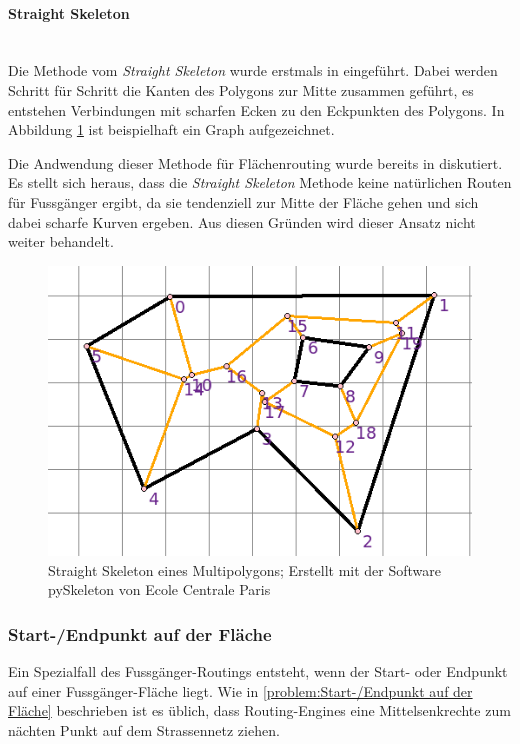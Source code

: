 \paragraph{Straight Skeleton}~\\

Die Methode vom \emph{Straight Skeleton} wurde erstmals in \cite{aichholzer_skeleton} eingeführt. Dabei werden Schritt für Schritt die Kanten des Polygons zur Mitte zusammen geführt, es entstehen Verbindungen mit scharfen Ecken zu den Eckpunkten des Polygons. In Abbildung \ref{fig:skeleton_example} ist beispielhaft ein Graph aufgezeichnet.

Die Andwendung dieser Methode für Flächenrouting wurde bereits in \cite{graser_visibility_graph} diskutiert. Es stellt sich heraus, dass die \emph{Straight Skeleton} Methode keine natürlichen Routen für Fussgänger ergibt, da sie tendenziell zur Mitte der Fläche gehen und sich dabei scharfe Kurven ergeben. Aus diesen Gründen wird dieser Ansatz nicht weiter behandelt.

\begin{figure}[th]
\centering
\includegraphics[width=0.7\linewidth]{technicalreport/img/skeleton_example.png}
\caption[Straight Skeleton Beispiel]{Straight Skeleton eines Multipolygons; Erstellt mit der Software pySkeleton von Ecole Centrale Paris}
\label{fig:skeleton_example}
\end{figure}


\subsubsection{Start-/Endpunkt auf der Fläche}
\label{subsub:Start-/Endpunkt auf der Fläche}
Ein Spezialfall des Fussgänger-Routings entsteht, wenn der Start- oder Endpunkt auf einer Fussgänger-Fläche liegt. Wie in \ref{problem:Start-/Endpunkt auf der Fläche} beschrieben ist es üblich, dass Routing-Engines eine Mittelsenkrechte zum nächten Punkt auf dem Strassennetz ziehen.


